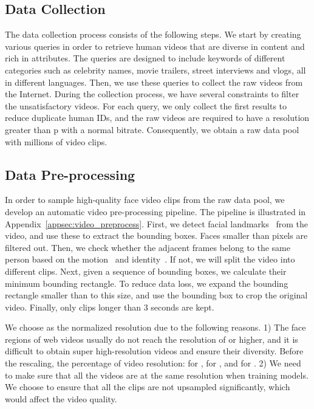 \documentclass[runningheads]{llncs}
\begin{document}
\subsection{Data Collection}

The data collection process consists of the following steps. 
We start by creating various queries in order to retrieve human videos that are diverse in content and rich in attributes. The queries are designed to include keywords of different categories such as celebrity names, movie trailers, street interviews and vlogs, all in different languages. 
Then, we use these queries to collect the raw videos from the Internet. During the collection process, we have several constraints to filter the unsatisfactory videos. For each query, we only collect the first  results to reduce duplicate human IDs, and the raw videos are required to have a resolution greater than p with a normal bitrate. Consequently, we obtain a raw data pool with millions of video clips.


\subsection{Data Pre-processing}
\label{sec:video_preprocess}
In order to sample high-quality face video clips from the raw data pool, we develop an automatic video pre-processing pipeline. The pipeline is illustrated in Appendix~\ref{appsec:video_preprocess}.
First, we detect  facial landmarks~\cite{wu2018look} from the video, and use these to extract the bounding boxes. Faces smaller than  pixels are filtered out. Then, we check whether the adjacent frames belong to the same person based on the motion~\cite{sort} and identity~\cite{arcface}. If not, we will split the video into different clips.
Next, given a sequence of bounding boxes, we calculate their minimum bounding rectangle. To reduce data loss, we expand the bounding rectangle smaller than  to this size, and use the bounding box to crop the original video.
Finally, only clips longer than 3 seconds are kept.



We choose  as the normalized resolution due to the following reasons. 
1) The face regions of web videos usually do not reach the resolution of  or higher, and it is difficult to obtain super high-resolution videos and ensure their diversity. Before the rescaling, the percentage of video resolution:  for ,  for , and  for .
2) We need to make sure that all the videos are at the same resolution when training models. We choose  to ensure that all the clips are not upsampled significantly, which would affect the video quality.
\end{document}
